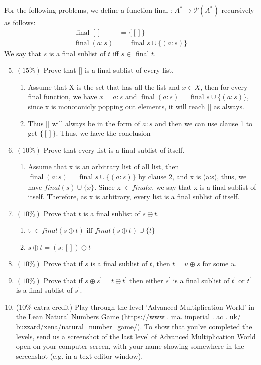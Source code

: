 \documentclass[10pt]{article}
\begin{document}
For the following problems, we define a function final : $A^{*} \rightarrow \mathcal{P}\left(A^{*}\right)$ recursively as follows:
$$
\begin{aligned}
\text { final }[] &=\{[]\} \\
\operatorname{final}(a: s) &=\text { final } s \cup\{(a: s)\}
\end{aligned}
$$
We say that $s$ is a final sublist of $t$ iff $s \in$ final $t$.

\begin{enumerate}
  \setcounter{enumi}{4}
  \item $(15 \%)$ Prove that [] is a final sublist of every list.
  \begin{enumerate}
    \item Assume that X is the set that has all the list and $x \in X$, then for every final function, we have $x = a: s$ and $\operatorname{final}(a: s) =\text { final } s \cup\{(a: s)\}$, since x is monotonicly popping out elements, it will reach [] as always. 
    \item Thus [] will always be in the form of $a : s$ and then we can use clause 1 to get $\{[]\}$. Thus, we have the conclusion
  \end{enumerate}
  \item $(10 \%)$ Prove that every list is a final sublist of itself.
  \begin{enumerate}
    \item Assume that x is an arbitrary list of all list, then $\operatorname{final}(a: s) =\text { final } s \cup\{(a: s)\}$ by clause 2, and x is (a:s), thus, we have ${final} (s) \cup \{x\}$. Since x $\in final x$, we say that x is a final sublist of itself. Therefore, as x is arbitrary, every list is a final sublist of itself. 
  \end{enumerate}
  \item $(10 \%)$ Prove that $t$ is a final sublist of $s \oplus t$.
  \begin{enumerate}
    \item t $\in final(s \oplus t)$ iff ${final}(s \oplus t)\cup \{t\}$ 
    \item $s \oplus t = (s:[]) \oplus t $
  \end{enumerate}

  \item $(10 \%)$ Prove that if $s$ is a final sublist of $t$, then $t=u \oplus s$ for some $u$.

  \item $(10 \%)$ Prove that if $s \oplus s^{\prime}=t \oplus t^{\prime}$ then either $s^{\prime}$ is a final sublist of $t^{\prime}$ or $t^{\prime}$ is a final sublist of $s^{\prime}$.

  \item (10\% extra credit) Play through the level 'Advanced Multiplication World' in the Lean Natural Numbers Game (\href{https://www}{https://www} . ma. imperial . ac . uk/ buzzard/xena/natural\_number\_game/). To show that you've completed the levels, send us a screenshot of the last level of Advanced Multiplication World open on your computer screen, with your name showing somewhere in the screenshot (e.g. in a text editor window).

\end{enumerate}
\end{document}
